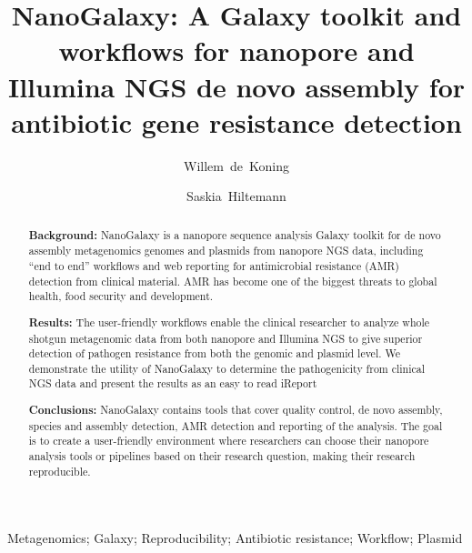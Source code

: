 \documentclass[a4paper,num-refs]{oup-contemporary}
\title{NanoGalaxy: A Galaxy toolkit and workflows for nanopore and Illumina NGS de novo assembly for antibiotic gene resistance detection}
\author[1,\authfn{1},\authfn{2}]{Willem~de~Koning}
\author[2,\authfn{1},\authfn{2}]{Saskia~Hiltemann}
\affil[1]{Erasmus Medical Center, Department of Pathology, Wytemaweg 80, 3015 CN, Rotterdam, The Netherlands}
\affil[2]{Second Institution}
\begin{document}
\begin{frontmatter}
\maketitle
\begin{abstract}

\textbf{Background:} NanoGalaxy is a nanopore sequence analysis Galaxy toolkit for de novo assembly metagenomics genomes and plasmids from nanopore NGS data, including “end to end” workflows and web reporting for antimicrobial resistance (AMR) detection from clinical material. AMR has become one of the biggest threats to global health, food security and development. 

\textbf{Results:} The user-friendly workflows enable the clinical researcher to analyze whole shotgun metagenomic data from both nanopore and Illumina NGS to give superior detection of pathogen resistance from both the genomic and plasmid level.  We demonstrate the utility of NanoGalaxy to determine the pathogenicity from clinical NGS data and present the results as an easy to read iReport

\textbf{Conclusions:} NanoGalaxy contains tools that cover quality control, de novo assembly, species and assembly detection, AMR detection and reporting of the analysis. The goal is to create a user-friendly environment where researchers can choose their nanopore analysis tools or pipelines based on their research question, making their research reproducible.
\end{abstract}

\begin{keywords}
Metagenomics; Galaxy; Reproducibility; Antibiotic resistance; Workflow; Plasmid
\end{keywords}
\end{frontmatter}

\end{document}
